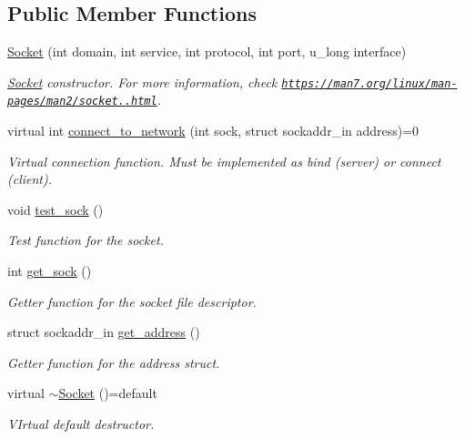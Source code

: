\subsection*{Public Member Functions}
\begin{DoxyCompactItemize}
\item 
\hyperlink{classSocket_a8be4869e74ddaa7ca8b2a0002fe3ac8e}{Socket} (int domain, int service, int protocol, int port, u\+\_\+long interface)
\begin{DoxyCompactList}\small\item\em \hyperlink{classSocket}{Socket} constructor. For more information, check \href{https://man7.org/linux/man-pages/man2/socket.2.html}{\tt https\+://man7.\+org/linux/man-\/pages/man2/socket..\+html}. \end{DoxyCompactList}\item 
virtual int \hyperlink{classSocket_a2483ca0900b0d55cfeb4b6cf5724c1e7}{connect\+\_\+to\+\_\+network} (int sock, struct sockaddr\+\_\+in address)=0
\begin{DoxyCompactList}\small\item\em Virtual connection function. Must be implemented as bind (server) or connect (client). \end{DoxyCompactList}\item 
\mbox{\label{classSocket_a2a3fd953636d01a796d8b648c785d625}} 
void \hyperlink{classSocket_a2a3fd953636d01a796d8b648c785d625}{test\+\_\+sock} ()
\begin{DoxyCompactList}\small\item\em Test function for the socket. \end{DoxyCompactList}\item 
\mbox{\label{classSocket_a134a2436c9fff81048d7815eca284232}} 
int \hyperlink{classSocket_a134a2436c9fff81048d7815eca284232}{get\+\_\+sock} ()
\begin{DoxyCompactList}\small\item\em Getter function for the socket file descriptor. \end{DoxyCompactList}\item 
\mbox{\label{classSocket_a6a36bc269e33e3ffda2c224a9b8bf961}} 
struct sockaddr\+\_\+in \hyperlink{classSocket_a6a36bc269e33e3ffda2c224a9b8bf961}{get\+\_\+address} ()
\begin{DoxyCompactList}\small\item\em Getter function for the address struct. \end{DoxyCompactList}\item 
\mbox{\label{classSocket_a073b4b728d8b6e366db9caa37a59dbbb}} 
virtual \hyperlink{classSocket_a073b4b728d8b6e366db9caa37a59dbbb}{$\sim$\+Socket} ()=default
\begin{DoxyCompactList}\small\item\em V\+Irtual default destructor. \end{DoxyCompactList}\end{DoxyCompactItemize}


